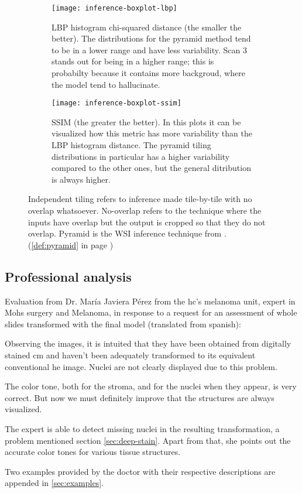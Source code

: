 \documentclass[../main.tex]{subfiles}
\begin{document}
\begin{figure}
\centering
\begin{subfigure}{.8\textwidth}
\centering
\texttt{[image: inference-boxplot-lbp]}
\caption{LBP histogram chi-squared distance (the smaller the better).
The distributions for the pyramid method tend to be in a lower range and
have less variability. Scan 3 stands out for being in a higher range; this is
probabilty because it contains more backgroud, where the model tend to
hallucinate.}
\label{fig:inference-lbp-comparison}
\end{subfigure}
\begin{subfigure}{.8\textwidth}
\centering
\texttt{[image: inference-boxplot-ssim]}
\caption{SSIM (the greater the better). In this plots it can be visualized how
this metric has more variability than the LBP histogram distance. The pyramid
tiling distributions in particular has a higher variability compared to the
other ones, but the general ditribution is always higher.}
\label{fig:inference-ssim-comparison}
\end{subfigure}
\caption{Independent tiling refers to inference made tile-by-tile with no overlap
whatsoever. No-overlap refers to the technique where the inputs have overlap but
the output is cropped so that they do not overlap. Pyramid is the WSI inference
technique from \cite{Bel2019}. (\ref{def:pyramid} in page \pageref{def:pyramid})}
\label{fig:inference-comparison}
\end{figure}

\subsection{Professional analysis}

Evaluation from Dr. María Javiera Pérez from the \gls{hc}'s melanoma unit,
expert in Mohs surgery and Melanoma,
in response to a request for an assessment of whole slides transformed with the
final model (translated from spanish):

\begin{displayquote}
Observing the images, it is intuited that they have been obtained from digitally
stained \gls{cm} and haven't been adequately transformed to its equivalent
conventional \gls{he} image. Nuclei are not clearly displayed due to this problem.

The color tone, both for the stroma, and for the nuclei when they appear, is
very correct.
But now we must definitely improve that the structures are always visualized.
\end{displayquote}

The expert is able to detect missing nuclei in the resulting transformation,
a problem mentioned section \ref{sec:deep-stain}.
Apart from that, she points out the accurate color tones for various
tissue structures.

Two examples provided by the doctor with their respective descriptions are
appended in \ref{sec:examples}.
\end{document}
